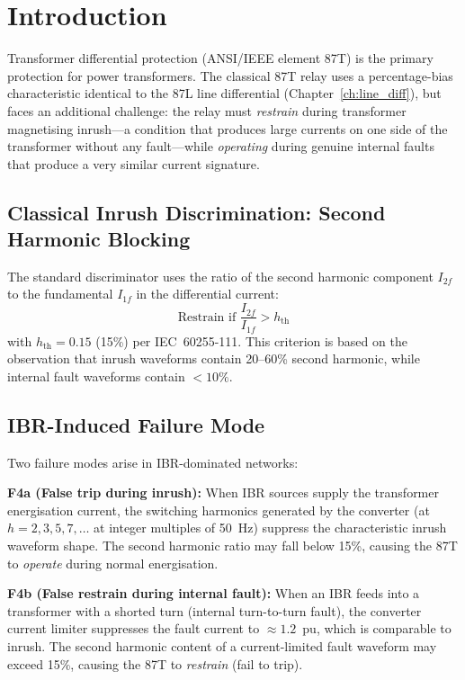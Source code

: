 
\section{Introduction}
\label{sec:ch6_intro}

Transformer differential protection (ANSI/IEEE element 87T) is the
primary protection for power transformers. The classical 87T relay uses
a percentage-bias characteristic identical to the 87L line differential
(Chapter~\ref{ch:line_diff}), but faces an additional challenge: the
relay must \emph{restrain} during transformer magnetising inrush---a
condition that produces large currents on one side of the transformer
without any fault---while \emph{operating} during genuine internal faults
that produce a very similar current signature.

\subsection{Classical Inrush Discrimination: Second Harmonic Blocking}

The standard discriminator uses the ratio of the second harmonic component
$I_{2f}$ to the fundamental $I_{1f}$ in the differential current:
\begin{equation}
  \text{Restrain if } \frac{I_{2f}}{I_{1f}} > h_\mathrm{th}
  \label{eq:ch6_harmonic_block}
\end{equation}
with $h_\mathrm{th} = 0.15$ (15\%) per IEC~60255-111. This criterion is
based on the observation that inrush waveforms contain 20--60\% second
harmonic, while internal fault waveforms contain $< 10\%$.

\subsection{IBR-Induced Failure Mode}

Two failure modes arise in IBR-dominated networks:

\textbf{F4a (False trip during inrush):} When IBR sources supply the
transformer energisation current, the switching harmonics generated by
the converter (at $h = 2, 3, 5, 7, \ldots$ at integer multiples of
50~Hz) suppress the characteristic inrush waveform shape. The second
harmonic ratio may fall below 15\%, causing the 87T to \emph{operate}
during normal energisation.

\textbf{F4b (False restrain during internal fault):} When an IBR feeds
into a transformer with a shorted turn (internal turn-to-turn fault),
the converter current limiter suppresses the fault current to $\approx 1.2$~pu,
which is comparable to inrush. The second harmonic content of a
current-limited fault waveform may exceed 15\%, causing the 87T to
\emph{restrain} (fail to trip).

